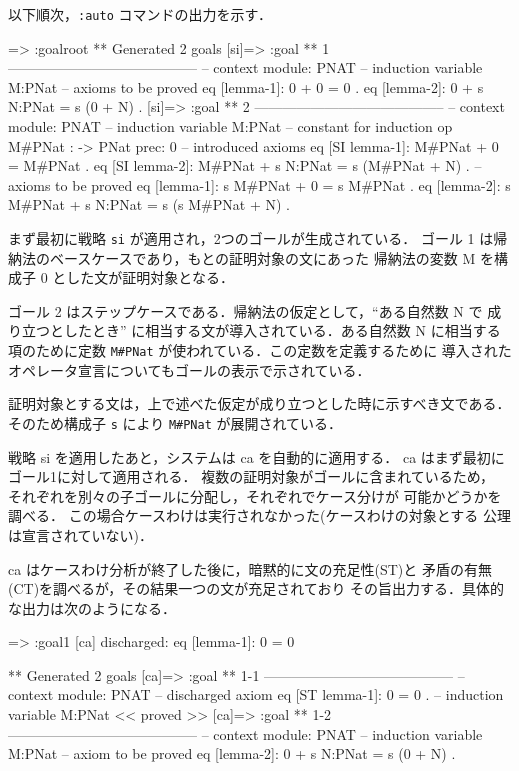 \documentclass[a4paper,oneside,10pt,here]{memoir}
\newenvironment{vvtm}%
{\parskip=0pt\lineskip=0pt\begin{center}\begin{minipage}{0.8\textwidth}\begin{snugshade}}%
  {\end{snugshade}\end{minipage}\end{center}}
\begin{document}
以下順次，\texttt{:auto} コマンドの出力を示す．
\begin{vvtm}
  \begin{simplev}
[si]=> :goal{root}
** Generated 2 goals
[si]=>
:goal { ** 1 -----------------------------------------
  -- context module: PNAT
  -- induction variable
    M:PNat
  -- axioms to be proved
    eq [lemma-1]: 0 + 0 = 0 .
    eq [lemma-2]: 0 + s N:PNat = s (0 + N) .
}
[si]=>
:goal { ** 2 -----------------------------------------
  -- context module: PNAT
  -- induction variable
    M:PNat
  -- constant for induction
    op M#PNat : -> PNat { prec: 0 }
  -- introduced axioms
    eq [SI lemma-1]: M#PNat + 0 = M#PNat .
    eq [SI lemma-2]: M#PNat + s N:PNat = s (M#PNat + N) .
  -- axioms to be proved
    eq [lemma-1]: s M#PNat + 0 = s M#PNat .
    eq [lemma-2]: s M#PNat + s N:PNat = s (s M#PNat + N) .
}
\end{simplev}
\end{vvtm}
まず最初に戦略 \texttt{si} が適用され，2つのゴールが生成されている．
ゴール 1 は帰納法のベースケースであり，もとの証明対象の文にあった
帰納法の変数 M を構成子 0 とした文が証明対象となる．

ゴール 2 はステップケースである．帰納法の仮定として，``ある自然数 N で
成り立つとしたとき'' に相当する文が導入されている．ある自然数 N に相当する
項のために定数 \verb|M#PNat| が使われている．この定数を定義するために
導入されたオペレータ宣言についてもゴールの表示で示されている．

証明対象とする文は，上で述べた仮定が成り立つとした時に示すべき文である．
そのため構成子 \texttt{s} により \verb|M#PNat| が展開されている．

戦略 si を適用したあと，システムは ca を自動的に適用する．
ca はまず最初にゴール1に対して適用される．
複数の証明対象がゴールに含まれているため，
それぞれを別々の子ゴールに分配し，それぞれでケース分けが
可能かどうかを調べる．
この場合ケースわけは実行されなかった(ケースわけの対象とする
公理は宣言されていない)．

ca はケースわけ分析が終了した後に，暗黙的に文の充足性(ST)と
矛盾の有無(CT)を調べるが，その結果一つの文が充足されており
その旨出力する．具体的な出力は次のようになる．

\begin{vvtm}
\begin{simplev}
[ca]=> :goal{1}
[ca] discharged: eq [lemma-1]: 0 = 0

** Generated 2 goals
[ca]=>
:goal { ** 1-1 -----------------------------------------
  -- context module: PNAT
  -- discharged axiom
    eq [ST lemma-1]: 0 = 0 .
  -- induction variable
    M:PNat
} << proved >>
[ca]=>
:goal { ** 1-2 -----------------------------------------
  -- context module: PNAT
  -- induction variable
    M:PNat
  -- axiom to be proved
    eq [lemma-2]: 0 + s N:PNat = s (0 + N) .
}
\end{simplev}
\end{vvtm}
\end{document}
